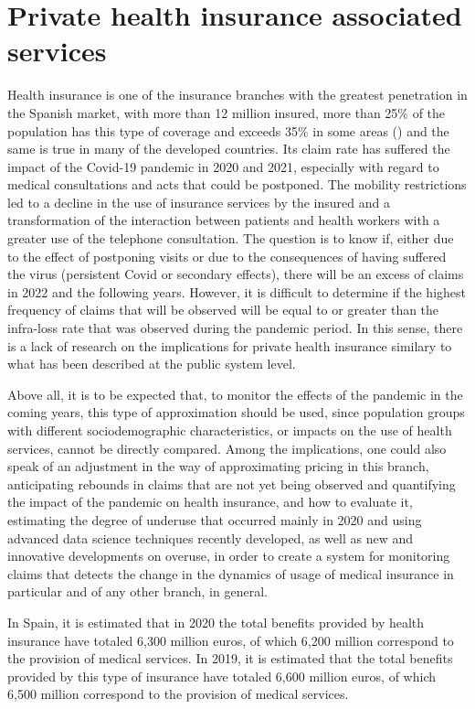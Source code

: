 \documentclass[main.tex]{subfiles}
\begin{document}
\section{Private health insurance associated services}\label{sec:private}
Health insurance is one of the insurance branches with the greatest penetration in the
Spanish market, with more than 12 million insured, more than 25\% of the population has
this type of coverage and exceeds 35\% in some areas (\cite{unespa_informe_2020}) and the same is
true in many of the developed countries. Its claim rate has suffered the impact of the
Covid-19 pandemic in 2020 and 2021, especially with regard to medical consultations and
acts that could be postponed. The mobility restrictions led to a decline in the use of
insurance services by the insured and a transformation of the interaction between patients and health workers with a greater use of the telephone consultation. The question is to know if, either due to the effect of
postponing visits or due to the consequences of having suffered the virus (persistent Covid
or secondary effects), there will be an excess of claims in 2022 and the following years. However, it is difficult to determine if the highest frequency of claims that will be observed will be equal to or greater than the infra-loss rate that was observed during the pandemic period. In this sense, there is a lack of research on the implications for private health insurance similary to what has been described at the public system level. 

Above all, it is to be expected that, to monitor the effects of the
pandemic in the coming years, this type of approximation should be used, since population
groups with different sociodemographic characteristics, or impacts on the use of health
services, cannot be directly compared. Among the implications, one could also speak of
an adjustment in the way of approximating pricing in this branch, anticipating rebounds in
claims that are not yet being observed and quantifying the impact of the
pandemic on health insurance, and how to evaluate it, estimating the degree of underuse
that occurred mainly in 2020 and using advanced data science techniques recently developed, as well as new and innovative developments on overuse, in order to create a
system for monitoring claims that detects the change in the dynamics of usage of medical
insurance in particular and of any other branch, in general. 

In Spain, it is estimated that in 2020 the total benefits provided by health insurance have totaled
6,300 million euros, of which 6,200 million correspond to the provision of medical services.
In 2019, it is estimated that the total benefits provided by this type of insurance have
totaled 6,600 million euros, of which 6,500 million correspond to the provision of medical
services.
\end{document}
